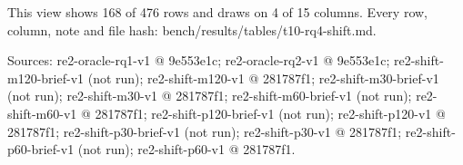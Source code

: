 \begin{table}[t]
This view shows 168 of 476 rows and draws on 4 of 15 columns. Every row, column, note and file hash: bench/\allowbreak{}results/\allowbreak{}tables/\allowbreak{}t10-rq4-shift.md.\par
Sources: re2-oracle-rq1-v1 @ 9e553e1c; re2-oracle-rq2-v1 @ 9e553e1c; re2-shift-m120-brief-v1 (not run); re2-shift-m120-v1 @ 281787f1; re2-shift-m30-brief-v1 (not run); re2-shift-m30-v1 @ 281787f1; re2-shift-m60-brief-v1 (not run); re2-shift-m60-v1 @ 281787f1; re2-shift-p120-brief-v1 (not run); re2-shift-p120-v1 @ 281787f1; re2-shift-p30-brief-v1 (not run); re2-shift-p30-v1 @ 281787f1; re2-shift-p60-brief-v1 (not run); re2-shift-p60-v1 @ 281787f1.\par
\end{table}
